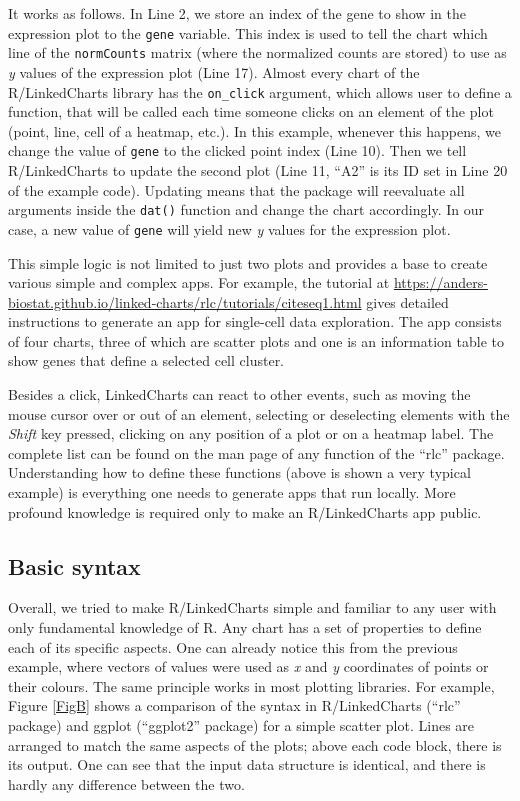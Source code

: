 \documentclass[twocolumn,10pt]{article}
\begin{document}
It works as follows. In Line 2, we store an index of the gene to show in the expression plot to the \texttt{gene} variable. This index is used to tell the chart which line of the \texttt{normCounts} matrix (where the normalized counts are stored) to use as \emph{y} values of the expression plot (Line 17). Almost every chart of the R/LinkedCharts library has the \texttt{on_click} argument, which allows user to define a function, that will be called each time someone clicks on an element of the plot (point, line, cell of a heatmap, etc.). In this example, whenever this happens, we change the value of \texttt{gene} to the clicked point index (Line 10). Then we tell R/LinkedCharts to update the second plot (Line 11, ``A2'' is its ID set in Line 20 of the example code). Updating means that the package will reevaluate all arguments inside the \texttt{dat()} function and change the chart accordingly. In our case, a new value of \texttt{gene} will yield new \emph{y} values for the expression plot.

This simple logic is not limited to just two plots and provides a base to create various simple and complex apps. For example, the tutorial at \url{https://anders-biostat.github.io/linked-charts/rlc/tutorials/citeseq1.html} gives detailed instructions to generate an app for single-cell data exploration. The app consists of four charts, three of which are scatter plots and one is an information table to show genes that define a selected cell cluster.

Besides a click, LinkedCharts can react to other events, such as moving the mouse cursor over or out of an element, selecting or deselecting elements with the \emph{Shift} key pressed, clicking on any position of a plot or on a heatmap label. The complete list can be found on the man page of any function of the ``rlc'' package. Understanding how to define these functions (above is shown a very typical example) is everything one needs to generate apps that run locally. More profound knowledge is required only to make an R/LinkedCharts app public. 

\subsection{Basic syntax}

Overall, we tried to make R/LinkedCharts simple and familiar to any user with only fundamental knowledge of R. Any chart has a set of properties to define each of its specific aspects. One can already notice this from the previous example, where vectors of values were used as \emph{x} and \emph{y} coordinates of points or their colours. The same principle works in most plotting libraries. For example, Figure \ref{FigB} shows a comparison of the syntax in R/LinkedCharts (``rlc'' package) and ggplot (``ggplot2'' \citep{wickham_2016} package) for a simple scatter plot. Lines are arranged to match the same aspects of the plots; above each code block, there is its output. One can see that the input data structure is identical, and there is hardly any difference between the two.
\end{document}
